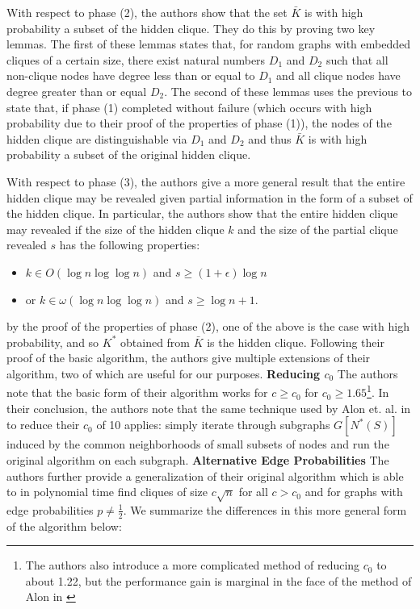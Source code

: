 \documentclass{article}
\theoremstyle{definition}
\begin{document}
With respect to phase (2), the authors show that the set 
$\bar{K}$ is with high probability a subset of the hidden clique.
They do this by proving two key lemmas.  The first of these 
lemmas states that, for random graphs with embedded cliques of
a certain size, there exist natural numbers $D_1$ and $D_2$ 
such that all non-clique nodes have degree less than or equal 
to $D_1$ and all clique nodes have degree greater than or 
equal $D_2$.  The second of these lemmas uses the previous 
to state that, if phase (1) completed without failure 
(which occurs with high probability due to their proof 
of the properties of phase (1)), the nodes of the 
hidden clique are distinguishable via $D_1$ and $D_2$ and thus 
$\bar{K}$ is with high probability a subset of the original hidden clique.

With respect to phase (3), the authors give a more 
general result that the entire hidden clique may be revealed 
given partial information in the form of a subset of the hidden 
clique.  In particular, the authors show that the entire hidden 
clique may revealed if the size of the hidden clique $k$ and the 
size of the partial clique revealed $s$ has the following properties:

\begin{itemize}
\item{$k \in O(\log{n}\log{\log{n}})$ and $s \geq (1 + \epsilon) \log{n}$}
\item{or $k \in \omega(\log{n}\log{\log{n}})$ and $s \geq \log{n} + 1$.}
\end{itemize}

\noindent by the proof of the properties of phase (2), one of the 
above is the case with high probability, and so $K^*$ obtained
from $\bar{K}$ is the hidden clique.
\newline\newline
Following their proof of the basic algorithm, the authors 
give multiple extensions of their algorithm, two of which are useful 
for our purposes.
\newline\newline
\noindent \textbf{Reducing $c_0$ } The authors note 
that the basic form of their algorithm works for 
$c \geq c_0$ for $c_0 \geq 1.65$\footnote{The authors also 
introduce a more complicated method of reducing $c_0$ to about 
1.22, but the performance gain is marginal in the face of 
the method of Alon in \cite{Spectral}}.  In their conclusion, the authors 
note that the same technique used by Alon et. al. in \cite{Spectral}
to reduce their $c_0$ of 10 applies: simply iterate through 
subgraphs $G[N^*(S)]$ induced by the common neighborhoods of small 
subsets of nodes and run the original algorithm on each 
subgraph.
\newline\newline
\noindent \textbf{Alternative Edge Probabilities } The authors 
further provide a generalization of their original algorithm 
which is able to in polynomial time find cliques of size $c\sqrt{n}$ 
for all $c > c_0$ and for graphs with edge probabilities
$p \neq \frac{1}{2}$.  We summarize the differences in this more 
general form of the algorithm below:
\end{document}
